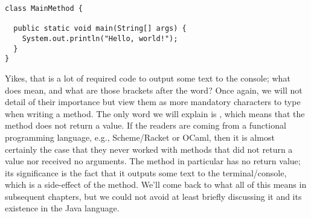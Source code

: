 \begin{lstlisting}[language=MyJava]
class MainMethod {

  public static void main(String[] args) {
    System.out.println("Hello, world!");
  }
}
\end{lstlisting}

Yikes, that is a lot of required code to output some text to the console; what does  mean, and what are those \ttt{[]} brackets after the  word? Once again, we will not detail of their importance but view them as more mandatory characters to type when writing a  method. The only word we will explain is , which means that the method does not return a value. If the readers are coming from a functional programming language, e.g., Scheme/Racket or OCaml, then it is almost certainly the case that they never worked with methods that did not return a value nor received no arguments. The  method in particular has no return value; its significance is the fact that it outputs some text to the terminal/console, which is a side-effect of the method. We'll come back to what all of this means in subsequent chapters, but we could not avoid at least briefly discussing it and its existence in the Java language.




  
